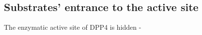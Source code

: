 \subsection{Substrates' entrance to the active site}

The enzymatic active site of DPP4 is hidden \beta-